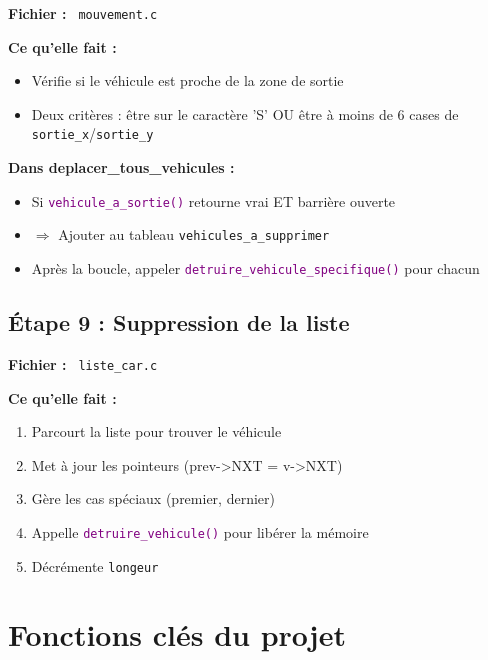 \documentclass[11pt,a4paper]{article}
\newcommand{\fichier}[1]{\texttt{\textcolor{primary}{\faIcon{file-code} #1}}}
\newcommand{\fonction}[1]{\texttt{\textcolor{purple}{#1()}}}
\newcommand{\variable}[1]{\texttt{\textcolor{success}{#1}}}
\begin{document}
\begin{funcbox}
\textbf{Fichier :} \fichier{mouvement.c}

\textbf{Ce qu'elle fait :}
\begin{itemize}[noitemsep]
    \item Vérifie si le véhicule est proche de la zone de sortie
    \item Deux critères : être sur le caractère 'S' OU être à moins de 6 cases de \variable{sortie\_x}/\variable{sortie\_y}
\end{itemize}

\textbf{Dans deplacer\_tous\_vehicules :}
\begin{itemize}[noitemsep]
    \item Si \fonction{vehicule\_a\_sortie} retourne vrai ET barrière ouverte
    \item $\Rightarrow$ Ajouter au tableau \variable{vehicules\_a\_supprimer}
    \item Après la boucle, appeler \fonction{detruire\_vehicule\_specifique} pour chacun
\end{itemize}
\end{funcbox}

\subsection{Étape 9 : Suppression de la liste}

\begin{funcbox}
\textbf{Fichier :} \fichier{liste\_car.c}

\textbf{Ce qu'elle fait :}
\begin{enumerate}[noitemsep]
    \item Parcourt la liste pour trouver le véhicule
    \item Met à jour les pointeurs (prev->NXT = v->NXT)
    \item Gère les cas spéciaux (premier, dernier)
    \item Appelle \fonction{detruire\_vehicule} pour libérer la mémoire
    \item Décrémente \variable{longeur}
\end{enumerate}
\end{funcbox}

\section{Fonctions clés du projet}
\end{document}

